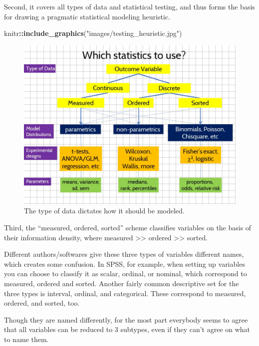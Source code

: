 \documentclass[]{book}
\newenvironment{Shaded}{\begin{snugshade}}{\end{snugshade}}
\newcommand{\KeywordTok}[1]{\textcolor[rgb]{0.13,0.29,0.53}{\textbf{#1}}}
\newcommand{\NormalTok}[1]{#1}
\newcommand{\OperatorTok}[1]{\textcolor[rgb]{0.81,0.36,0.00}{\textbf{#1}}}
\newcommand{\StringTok}[1]{\textcolor[rgb]{0.31,0.60,0.02}{#1}}
\begin{document}
Second, it covers all types of data and statistical testing, and thus forms the basis for drawing a pragmatic statistical modeling heuristic.

\begin{Shaded}
\begin{Highlighting}[]
\NormalTok{knitr}\OperatorTok{::}\KeywordTok{include_graphics}\NormalTok{(}\StringTok{"images/testing_heuristic.jpg"}\NormalTok{)}
\end{Highlighting}
\end{Shaded}

\begin{figure}
\includegraphics[width=13.33in]{images/testing_heuristic} \caption{The type of data dictates how it should be modeled.}\label{fig:unnamed-chunk-25}
\end{figure}

Third, the ``measured, ordered, sorted'' scheme classifies variables on the basis of their information density, where measured \textgreater{}\textgreater{} ordered \textgreater{}\textgreater{} sorted.

Different authors/softwares give these three types of variables different names, which creates some confusion. In SPSS, for example, when setting up variables you can choose to classify it as scalar, ordinal, or nominal, which correspond to measured, ordered and sorted. Another fairly common descriptive set for the three types is interval, ordinal, and categorical. These correspond to measured, ordered, and sorted, too.

Though they are named differently, for the most part everybody seems to agree that all variables can be reduced to 3 subtypes, even if they can't agree on what to name them.
\end{document}
